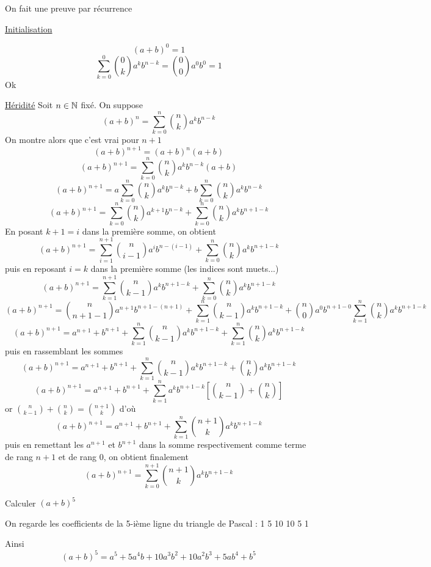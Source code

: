 \begin{preuve}
On fait une preuve par récurrence\newline 

\underline{Initialisation}\newline

$$(a+b)^0 = 1$$
$$\sum_{k=0}^0 \binom{0}{k}a^k b^{n-k} = \binom{0}{0} a^0b^0 = 1$$
Ok\newline

\underline{Héridité}\newline
Soit $n\in \mathbb{N}$ fixé. On suppose 
$$(a+b)^n = \sum_{k=0}^n \binom{n}{k}a^k b^{n-k}$$
On montre alors que c'est vrai pour $n+1$
$$(a+b)^{n+1} = (a+b)^n (a+b)$$
$$(a+b)^{n+1} = \sum_{k=0}^n \binom{n}{k}a^k b^{n-k} (a+b)$$
$$(a+b)^{n+1} = a\sum_{k=0}^n \binom{n}{k}a^k b^{n-k} + b\sum_{k=0}^n \binom{n}{k}a^k b^{n-k}$$
$$(a+b)^{n+1} = \sum_{k=0}^n \binom{n}{k}a^{k+1} b^{n-k} + \sum_{k=0}^n \binom{n}{k}a^k b^{n+1-k}$$
En posant $k+1 = i$ dans la première somme, on obtient 
$$(a+b)^{n+1} = \sum_{i=1}^{n+1} \binom{n}{i-1}a^{i} b^{n-(i-1)} + \sum_{k=0}^n \binom{n}{k}a^k b^{n+1-k}$$
puis en reposant $i = k$ dans la première somme (les indices sont muets...)
$$(a+b)^{n+1} = \sum_{k=1}^{n+1} \binom{n}{k-1}a^{k} b^{n+1-k} + \sum_{k=0}^n \binom{n}{k}a^k b^{n+1-k}$$
$$(a+b)^{n+1} = \binom{n}{n+1-1}a^{n+1}b^{n+1-(n+1)} + \sum_{k=1}^{n} \binom{n}{k-1}a^{k} b^{n+1-k} + \binom{n}{0}a^0b^{n+1-0} \sum_{k=1}^n \binom{n}{k}a^k b^{n+1-k}$$
$$(a+b)^{n+1} = a^{n+1} + b^{n+1} + \sum_{k=1}^{n} \binom{n}{k-1}a^{k} b^{n+1-k} + \sum_{k=1}^n \binom{n}{k}a^k b^{n+1-k}$$
puis en rassemblant les sommes
$$(a+b)^{n+1} = a^{n+1} + b^{n+1} + \sum_{k=1}^{n} \binom{n}{k-1}a^{k} b^{n+1-k} + \binom{n}{k}a^k b^{n+1-k}$$
$$(a+b)^{n+1} = a^{n+1} + b^{n+1} + \sum_{k=1}^{n} a^{k} b^{n+1-k}[\binom{n}{k-1} + \binom{n}{k}]$$
or $\binom{n}{k-1} + \binom{n}{k} = \binom{n+1}{k}$ d'où
$$(a+b)^{n+1} = a^{n+1} + b^{n+1} + \sum_{k=1}^{n} \binom{n+1}{k} a^{k} b^{n+1-k}$$
puis en remettant les $a^{n+1}$ et $b^{n+1}$ dans la somme respectivement comme terme de rang $n+1$ et de rang 0, on obtient finalement
$$(a+b)^{n+1} = \sum_{k=0}^{n+1} \binom{n+1}{k} a^{k} b^{n+1-k}$$
\end{preuve}
\begin{exemple}
Calculer $(a+b)^5$\newline

On regarde les coefficients de la 5-ième ligne du triangle de Pascal : 1 5 10 10 5 1\newline

Ainsi 
$$(a+b)^5 = a^5 + 5a^4b + 10a^3b^2 + 10a^2b^3 + 5ab^4 + b^5$$
\end{exemple}


